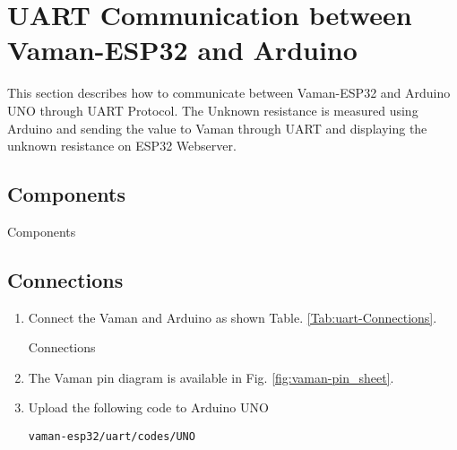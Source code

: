 \section{UART Communication between Vaman-ESP32 and Arduino}
This section describes how to communicate between Vaman-ESP32 and Arduino UNO 
through UART Protocol. The Unknown resistance is measured using Arduino and 
sending the value to Vaman through UART and displaying the unknown resistance on
ESP32 Webserver.
\subsection{Components}

\begin{table}[!ht]
\centering

\caption{Components}
\label{table:uart-components}
\end{table}

\subsection{Connections}
\begin{enumerate}[label=\thesection.\arabic*.,ref=\thesection.\theenumi]

\item
Connect the Vaman and Arduino as shown Table. \ref{Tab:uart-Connections}.

\begin{table}[!ht]
\centering

\caption{Connections}
\label{Tab:uart-Connections}
\end{table}
\item
The Vaman pin diagram is available in Fig. \ref{fig:vaman-pin_sheet}.

\item Upload the following code to Arduino UNO

\begin{lstlisting}
vaman-esp32/uart/codes/UNO
\end{lstlisting}
\end{enumerate}
